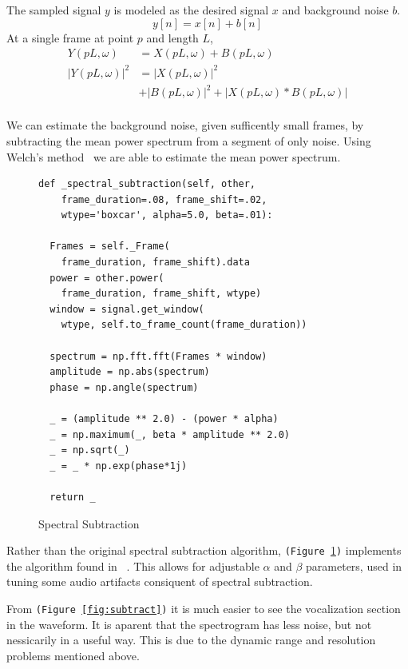 \documentclass{article}
\begin{document}
\begin{multicols}{2}
The sampled signal $y$ is modeled as the desired signal $x$ and background noise $b$. \[y[n] = x[n] + b[n]\]
At a single frame at point $p$ and length $L$,
\begin{align*}
  Y(pL, \omega) &= X(pL, \omega) + B(pL, \omega)\\
  |Y(pL, \omega)|^2 &= |X(pL, \omega)|^2 \\&+|B(pL, \omega)|^2 + |X(pL, \omega)*B(pL, \omega)|\\
\end{align*}

We can estimate the background noise, given sufficently small frames, by subtracting the mean power spectrum from a segment of only noise. Using Welch's method~\cite{welch1976} we are able to estimate the mean power spectrum.

\begin{figure}[H]

\begin{lstlisting}
def _spectral_subtraction(self, other,
    frame_duration=.08, frame_shift=.02,
    wtype='boxcar', alpha=5.0, beta=.01):

  Frames = self._Frame(
    frame_duration, frame_shift).data
  power = other.power(
    frame_duration, frame_shift, wtype)
  window = signal.get_window(
    wtype, self.to_frame_count(frame_duration))

  spectrum = np.fft.fft(Frames * window)
  amplitude = np.abs(spectrum)
  phase = np.angle(spectrum)

  _ = (amplitude ** 2.0) - (power * alpha)
  _ = np.maximum(_, beta * amplitude ** 2.0)
  _ = np.sqrt(_)
  _ = _ * np.exp(phase*1j)

  return _
\end{lstlisting}
  \caption{Spectral Subtraction}
  \label{fig:subtractpy}

\end{figure}

Rather than the original spectral subtraction algorithm, \texttt{(Figure~\ref{fig:subtractpy})} implements the algorithm found in ~\cite{Berouti1979EnhancementOS}. This allows for adjustable $\alpha$ and $\beta$ parameters, used in tuning some audio artifacts consiquent of spectral subtraction.

From \texttt{(Figure~\ref{fig:subtract})} it is much easier to see the vocalization section in the waveform. It is aparent that the spectrogram has less noise, but not nessicarily in a useful way. This is due to the dynamic range and resolution problems mentioned above.



\end{multicols}
\end{document}
